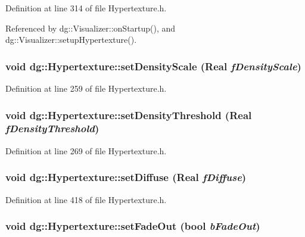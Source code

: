 Definition at line 314 of file Hypertexture.h.

Referenced by dg::Visualizer::on\-Startup(), and dg::Visualizer::setup\-Hypertexture().
\subsubsection{\setlength{\rightskip}{0pt plus 5cm}void dg::Hypertexture::set\-Density\-Scale ({\bf Real} {\em f\-Density\-Scale})\hspace{0.3cm}{\tt  [inline]}}\label{classdg_1_1Hypertexture_a26}




Definition at line 259 of file Hypertexture.h.
\subsubsection{\setlength{\rightskip}{0pt plus 5cm}void dg::Hypertexture::set\-Density\-Threshold ({\bf Real} {\em f\-Density\-Threshold})\hspace{0.3cm}{\tt  [inline]}}\label{classdg_1_1Hypertexture_a28}




Definition at line 269 of file Hypertexture.h.
\subsubsection{\setlength{\rightskip}{0pt plus 5cm}void dg::Hypertexture::set\-Diffuse ({\bf Real} {\em f\-Diffuse})\hspace{0.3cm}{\tt  [inline]}}\label{classdg_1_1Hypertexture_a18}




Definition at line 418 of file Hypertexture.h.
\subsubsection{\setlength{\rightskip}{0pt plus 5cm}void dg::Hypertexture::set\-Fade\-Out (bool {\em b\-Fade\-Out})\hspace{0.3cm}{\tt  [inline]}}\label{classdg_1_1Hypertexture_a47}




